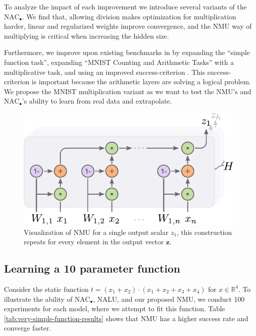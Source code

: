 To analyze the impact of each improvement we introduce several variants of the $\text{NAC}_{\bullet}$.
We find that, allowing division makes optimization for multiplication harder, linear and regularized weights improve convergence, and the NMU way of multiplying is critical when increasing the hidden size.

Furthermore, we improve upon existing benchmarks in \citet{trask-nalu} by expanding the ``simple function task'', expanding ``MNIST Counting and Arithmetic Tasks'' with a multiplicative task, and using an improved success-criterion \citet{maep-madsen-johansen-2019}.
This success-criterion is important because the arithmetic layers are solving a logical problem.
We propose the MNIST multiplication variant as we want to test the NMU’s and $\text{NAC}_{\bullet}$’s ability to learn from real data and extrapolate.


\begin{figure}[t]
\centering
\includegraphics[scale=0.65]{graphics/nmu.pdf}
\caption{Visualization of NMU for a single output scalar $z_1$, this construction repeats for every element in the output vector $\mathbf{z}$.}
\end{figure}

\subsection{Learning a 10 parameter function}
Consider the static function $t = (x_1 + x_2) \cdot (x_1 + x_2 + x_3 + x_4)$ for $x \in \mathbb{R}^4$. To illustrate the ability of $\mathrm{NAC}_{\bullet}$, NALU, and our proposed NMU, we conduct 100 experiments for each model, where we attempt to fit this function. Table \ref{tab:very-simple-function-results} shows that NMU has a higher success rate and converge faster.

